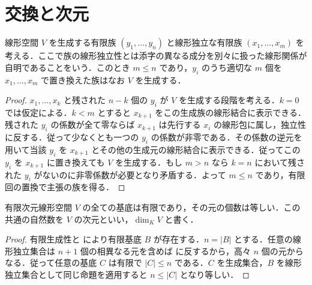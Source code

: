 \section{交換と次元}
\begin{prop}[交換補題]
線形空間 $V$ を生成する有限族 $(y_1,\ldots,y_n)$ と線形独立な有限族 $(x_1,\ldots,x_m)$ を考える．ここで族の線形独立性とは添字の異なる成分を別々に扱った線形関係が自明であることをいう．このとき $m\leq n$ であり，$y_i$ のうち適切な $m$ 個を $x_1,\ldots,x_m$ で置き換えた族はなお $V$ を生成する．
\end{prop}
\begin{proof}
$x_1,\ldots,x_k$ と残された $n-k$ 個の $y_i$ が $V$ を生成する段階を考える．$k=0$ では仮定による．$k<m$ とすると $x_{k+1}$ をこの生成族の線形結合に表示できる．残された $y_i$ の係数が全て零ならば $x_{k+1}$ は先行する $x_i$ の線形包に属し，独立性に反する．従って少なくとも一つの $y_i$ の係数が非零である．その係数の逆元を用いて当該 $y_i$ を $x_{k+1}$ とその他の生成元の線形結合に表示できる．従ってこの $y_i$ を $x_{k+1}$ に置き換えても $V$ を生成する．もし $m>n$ なら $k=n$ において残された $y_i$ がないのに非零係数が必要となり矛盾する．よって $m\leq n$ であり，有限回の置換で主張の族を得る．
\end{proof}
\begin{prop}[有限次元線形空間の次元]
有限次元線形空間 $V$ の全ての基底は有限であり，その元の個数は等しい．この共通の自然数を $V$ の次元といい，$\dim_K V$ と書く．
\end{prop}
\begin{proof}
有限生成性と により有限基底 $B$ が存在する．$n=|B|$ とする．任意の線形独立集合は $n+1$ 個の相異なる元を含めば に反するから，高々 $n$ 個の元からなる．従って任意の基底 $C$ は有限で $|C|\leq n$ である．$C$ を生成集合，$B$ を線形独立集合として同じ命題を適用すると $n\leq|C|$ となり等しい．
\end{proof}
